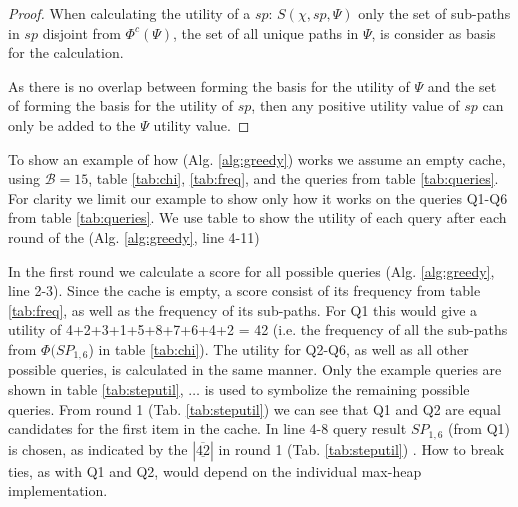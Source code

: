 \begin{proof}

When calculating the utility of a \spath $sp$: $S(\chi, sp, \Psi)$ only the set of sub-paths in $sp$ disjoint from $\Phi^c(\Psi)$, the set of all unique paths in $\Psi$, is consider as basis for the calculation. 

As there is no overlap between \spaths forming the basis for the utility of $\Psi$ and the set of \spaths forming the basis for the utility of $sp$, then any positive utility value of $sp$ can only be added to the $\Psi$ utility value. 

\end{proof}


To show an example of how \salgo (Alg. \ref{alg:greedy}) works we assume an empty cache, using $\mathcal{B}=15$, table \ref{tab:chi}, \ref{tab:freq}, and the queries from table \ref{tab:queries}. For clarity we limit our example to show only how it works on the queries Q1-Q6 from table \ref{tab:queries}. We use table \label{tab:steputil} to show the utility of each query after each round of the \salgo (Alg. \ref{alg:greedy}, line 4-11)

In the first round we calculate a score for all possible queries (Alg. \ref{alg:greedy}, line 2-3). Since the cache is empty, a \spath score consist of its frequency from table \ref{tab:freq}, as well as the frequency of its sub-paths. For Q1 this would give a utility of 4+2+3+1+5+8+7+6+4+2 = 42 (i.e. the frequency of all the sub-paths from $\Phi(SP_{1,6}$) in table \ref{tab:chi}). The utility for Q2-Q6, as well as all other possible queries, is calculated in the same manner. Only the example queries are shown in table \ref{tab:steputil}, $\dots$ is used to symbolize the remaining possible queries. From round 1 (Tab. \ref{tab:steputil}) we can see that Q1 and Q2 are equal candidates for the first item in the cache. In line 4-8 query result $SP_{1,6}$ (from Q1) is chosen, as indicated by the $| \underline{\overline{42}}|$ in round 1 (Tab. \ref{tab:steputil}) . How to break ties, as with Q1 and Q2, would depend on the individual max-heap implementation. 

